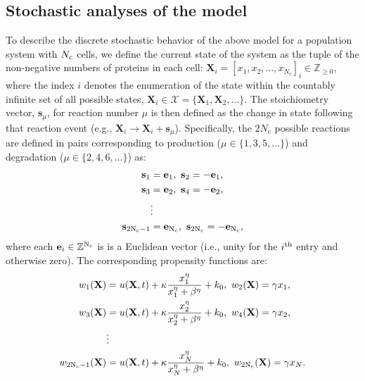 \documentclass[12pt]{iopart}
\begin{document}
\subsection{Stochastic analyses of the model}\label{sec:Stochastic}
To describe the discrete stochastic behavior of the above model for a population system with $N_{\rm c}$ cells, we define the current state of the system as the tuple of the non-negative numbers of proteins in each cell: $\mathbf{X}_i = [x_{1},x_{2},\ldots,x_{N_c}]_i\in \mathbb{Z}_{\ge 0}$, where the index $i$ denotes the enumeration of the state within the countably infinite set of all possible states, $\mathbf{X}_i\in\mathcal{X}=\{\mathbf{X}_1,\mathbf{X}_2,\ldots\}$.
The stoichiometry vector, $\mathbf{s}_{\mu}$, for reaction number $\mu$ is then defined as the change in state following that reaction event (e.g., $\mathbf{X}_i \rightarrow \mathbf{X}_i + \mathbf{s}_\mu$). Specifically, the $2N_c$ possible reactions are defined in pairs corresponding to production ($\mu\in\{1,3,5,\ldots\}$) and degradation ($\mu\in\{2,4,6,\ldots\}$) as:
\begin{eqnarray}
\mathbf{s}_1 &= \mathbf{e}_1,\ \mathbf{s}_2 = -\mathbf{e}_1,\nonumber\\ 
\mathbf{s}_3 &= \mathbf{e}_2,\ \mathbf{s}_4 = -\mathbf{e}_2,\nonumber\\
&\vdots \nonumber\\ 
\mathbf{s}_{\rm 2N_c-1} &= \mathbf{e}_{\rm N_c},\ \mathbf{s}_{\rm 2N_c} = -\mathbf{e}_{\rm N_c}, \label{Stochs}
 \end{eqnarray}
where each $\mathbf{e}_{i}\in\mathbb{Z}^{{\rm N_ c}}$ is is a Euclidean vector (i.e., unity for the $i^{\rm th}$ entry and otherwise zero). The corresponding propensity functions are:
\begin{eqnarray}
w_1(\mathbf{X}) &= u(\mathbf{X},t)  + \kappa \frac{x_1^\eta}{x_1^{\eta}+\beta^{\eta}} + k_0,\ w_2(\mathbf{X}) = \gamma x_1,\nonumber\\
w_3(\mathbf{X}) &= u(\mathbf{X},t)  + \kappa \frac{x_2^\eta}{x_2^{\eta}+\beta^{\eta}} + k_0,\ w_4(\mathbf{X}) = \gamma x_2,\nonumber\\
&\vdots \nonumber\\
w_{\rm 2N_c-1}(\mathbf{X}) &= u(\mathbf{X},t)  + \kappa \frac{x_N^\eta}{x_N^{\eta}+\beta^{\eta}} + k_0,\ w_{\rm 2N_c}(\mathbf{X}) = \gamma x_N.\label{Props}
 \end{eqnarray}
\end{document}
